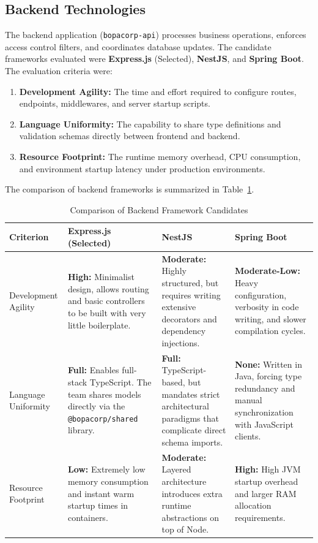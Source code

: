 \documentclass[letterpaper%
, oneside%
, 12pt%
, memoireprojet%
, english%
,creativecommons,hyperref, withAlgo2e %
]{thETS}
\begin{document}
\subsection{Backend Technologies}
The backend application (\texttt{bopacorp-api}) processes business operations, enforces access control filters, and coordinates database updates. The candidate frameworks evaluated were \textbf{Express.js} (Selected), \textbf{NestJS}, and \textbf{Spring Boot}. The evaluation criteria were:
\begin{enumerate}
    \item \textbf{Development Agility:} The time and effort required to configure routes, endpoints, middlewares, and server startup scripts.
    \item \textbf{Language Uniformity:} The capability to share type definitions and validation schemas directly between frontend and backend.
    \item \textbf{Resource Footprint:} The runtime memory overhead, CPU consumption, and environment startup latency under production environments.
\end{enumerate}

The comparison of backend frameworks is summarized in Table~\ref{tab:backend_comparison}.

\begin{table}[H]
\centering
\begin{tabular}{|p{2.5cm}|p{4.2cm}|p{4.2cm}|p{4.2cm}|}
\hline
\textbf{Criterion} & \textbf{Express.js (Selected)} & \textbf{NestJS} & \textbf{Spring Boot} \\ \hline
Development Agility & \textbf{High:} Minimalist design, allows routing and basic controllers to be built with very little boilerplate. & \textbf{Moderate:} Highly structured, but requires writing extensive decorators and dependency injections. & \textbf{Moderate-Low:} Heavy configuration, verbosity in code writing, and slower compilation cycles. \\ \hline
Language Uniformity & \textbf{Full:} Enables full-stack TypeScript. The team shares models directly via the \texttt{@bopacorp/shared} library. & \textbf{Full:} TypeScript-based, but mandates strict architectural paradigms that complicate direct schema imports. & \textbf{None:} Written in Java, forcing type redundancy and manual synchronization with JavaScript clients. \\ \hline
Resource Footprint & \textbf{Low:} Extremely low memory consumption and instant warm startup times in containers. & \textbf{Moderate:} Layered architecture introduces extra runtime abstractions on top of Node. & \textbf{High:} High JVM startup overhead and larger RAM allocation requirements. \\ \hline
\end{tabular}
\caption{Comparison of Backend Framework Candidates}
\label{tab:backend_comparison}
\end{table}
\end{document}
